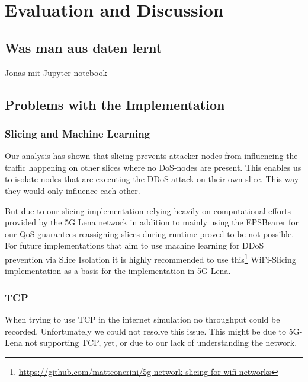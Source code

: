 
\chapter{Evaluation and Discussion}
\label{chapter:evaluation}
\section{Was man aus daten lernt}
    Jonas mit Jupyter notebook
    
\section{Problems with the Implementation}
    \subsection{Slicing and Machine Learning}
    Our analysis has shown that slicing prevents attacker nodes from influencing the traffic happening on other slices where no DoS-nodes are present. This enables us to isolate nodes that are executing the DDoS attack on their own slice. This way they would only influence each other.
    
    But due to our slicing implementation relying heavily on computational efforts provided by the 5G Lena network in addition to mainly using the EPSBearer for our QoS guarantees reassigning slices during runtime proved to be not possible. 
    For future implementations that aim to use machine learning for DDoS prevention via Slice Isolation it is highly recommended to use this\footnote[7]{\url{https://github.com/matteonerini/5g-network-slicing-for-wifi-networks}} WiFi-Slicing implementation as a basis for the implementation in 5G-Lena.
    
    \subsection{TCP}
    When trying to use TCP in the internet simulation no throughput could be recorded. Unfortunately we could not resolve this issue. This might be due to 5G-Lena not supporting TCP, yet, or due to our lack of understanding the network.